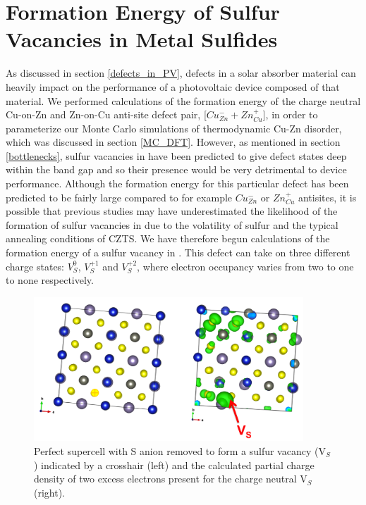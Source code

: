 \section{Formation Energy of Sulfur Vacancies in Metal Sulfides}\label{Vs_proj}
As discussed in section \ref{defects_in_PV}, defects in a solar absorber material can heavily impact on the performance of a photovoltaic device composed of that material. We performed calculations of the formation energy of the charge neutral Cu-on-Zn and Zn-on-Cu anti-site defect pair, [$Cu_{Zn}^- + Zn_{Cu}^+$], in order to parameterize our Monte Carlo simulations of thermodynamic Cu-Zn disorder, which was discussed in section \ref{MC_DFT}. However, as mentioned in section \ref{bottlenecks}, sulfur vacancies in {\CZTS} have been predicted to give defect states deep within the band gap and so their presence would be very detrimental to device performance. Although the formation energy for this particular defect has been predicted to be fairly large compared to for example $Cu_{Zn}^-$ or $Zn_{Cu}^+$ antisites, it is possible that previous studies may have underestimated the likelihood of the formation of sulfur vacancies in {\CZTS} due to the volatility of sulfur and the typical annealing conditions of CZTS. We have therefore begun calculations of the formation energy of a sulfur vacancy in {\CZTS }. This defect can take on three different charge states: $V_{S}^{0}$, $V_{S}^{+1}$ and $V_{S}^{+2}$, where electron occupancy varies from two to one to none respectively. 
\begin{figure}[h!]
  \centering
    \includegraphics[width=0.9\textwidth]{figures/V_S-neutral-PARCHG.png}
    \caption{Perfect {\CZTS } supercell with S anion removed to form a sulfur vacancy (V$_S$) indicated by a crosshair (left) and the calculated partial charge density of two excess electrons present for the charge neutral V$_S$ (right).}
  \label{V_S-neutral-PARCHG}
\end{figure}
